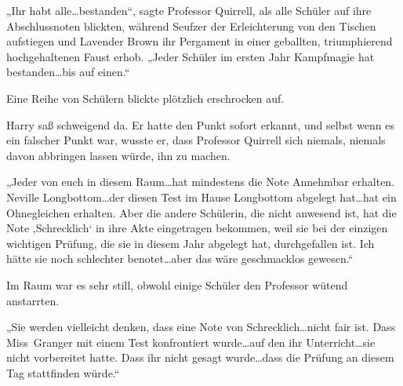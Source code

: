 „Ihr habt alle…bestanden“, sagte Professor Quirrell, als alle Schüler auf ihre Abschlussnoten blickten, während Seufzer der Erleichterung von den Tischen aufstiegen und Lavender Brown ihr Pergament in einer geballten, triumphierend hochgehaltenen Faust erhob.
„Jeder Schüler im ersten Jahr Kampfmagie hat bestanden…bis auf einen.“

Eine Reihe von Schülern blickte plötzlich erschrocken auf.

Harry saß schweigend da. Er hatte den Punkt sofort erkannt, und selbst wenn es ein falscher Punkt war, wusste er, dass Professor Quirrell sich niemals, niemals davon abbringen lassen würde, ihn zu machen.

„Jeder von euch in diesem Raum…hat mindestens die Note Annehmbar erhalten. Neville Longbottom…der diesen Test im Hause Longbottom abgelegt hat…hat ein Ohnegleichen erhalten. Aber die andere Schülerin, die nicht anwesend ist, hat die Note ‚Schrecklich‘ in ihre Akte eingetragen bekommen, weil sie bei der einzigen wichtigen Prüfung, die sie in diesem Jahr abgelegt hat, durchgefallen ist. Ich hätte sie noch schlechter benotet…aber das wäre geschmacklos gewesen.“

Im Raum war es sehr still, obwohl einige Schüler den Professor wütend anstarrten.

„Sie werden vielleicht denken, dass eine Note von Schrecklich…nicht fair ist. Dass Miss~Granger mit einem Test konfrontiert wurde…auf den ihr Unterricht…sie nicht vorbereitet hatte. Dass ihr nicht gesagt wurde…dass die Prüfung an diesem Tag stattfinden würde.“

